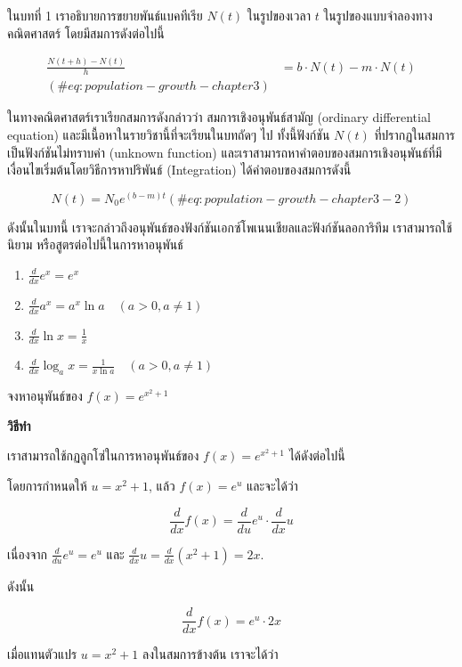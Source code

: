 \documentclass[
]{book}
\providecommand{\tightlist}{%
  \setlength{\itemsep}{0pt}\setlength{\parskip}{0pt}}
\begin{document}
ในบทที่ 1 เราอธิบายการขยายพันธ์แบคทีเรีย \(N(t)\) ในรูปของเวลา \(t\)
ในรูปของแบบจำลองทางคณิตศาสตร์ โดยมีสมการดังต่อไปนี้

\begin{align}
\frac{N(t + h) - N(t)}{h} &= b\cdot N(t)  - m\cdot N(t)\\
(\#eq:population-growth-chapter3)
\end{align}

ในทางคณิตศาสตร์เราเรียกสมการดังกล่าวว่า สมการเชิงอนุพันธ์สามัญ (ordinary
differential equation) และมีเนื้อหาในรายวิชานี้ที่จะเรียนในบทถัดๆ ไป ทั้งนี้ฟังก์ชัน
\(N(t)\) ที่ปรากฏในสมการเป็นฟังก์ชันไม่ทราบค่า (unknown function)
และเราสามารถหาคำตอบของสมการเชิงอนุพันธ์ที่มีเงื่อนไขเริ่มต้นโดยวิธีการหาปริพันธ์
(Integration) ได้คำตอบของสมการดังนี้

\begin{equation}
N(t) = N_0 e^{(b-m)t}
(\#eq:population-growth-chapter3-2)
\end{equation}

ดังนั้นในบทนี้ เราจะกล่าวถึงอนุพันธ์ของฟังก์ชันเอกซ์โพเนนเชียลและฟังก์ชันลอการิทึม
เราสามารถใช้นิยาม หรือสูตรต่อไปนี้ในการหาอนุพันธ์

\begin{enumerate}
\def\labelenumi{\arabic{enumi}.}
\tightlist
\item
  \(\displaystyle\frac{d}{dx}e^x = e^x\)
\item
  \(\displaystyle\frac{d}{dx}a^x = a^x \ln a \quad (a > 0, a \neq 1)\)
\item
  \(\displaystyle\frac{d}{dx}\ln x = \frac{1}{x}\)
\item
  \(\displaystyle\frac{d}{dx}\log_a x = \frac{1}{x \ln a} \quad (a > 0, a \neq 1)\)
\end{enumerate}

จงหาอนุพันธ์ของ \(f(x) = e^{x^2 + 1}\)

\textbf{วิธีทำ}

เราสามารถใช้กฏลูกโซ่ในการหาอนุพันธ์ของ \(f(x) = e^{x^2 + 1}\) ได้ดังต่อไปนี้

โดยการกำหนดให้ \(u = x^2 + 1\), แล้ว \(f(x) = e^u\) และจะได้ว่า

\[ \frac{d}{dx} f(x) = \frac{d}{du} e^u \cdot \frac{d}{dx} u \]

เนื่องจาก \(\frac{d}{du} e^u = e^u\) และ
\(\frac{d}{dx} u = \frac{d}{dx} (x^2 + 1) = 2x\).

ดังนั้น

\[ \frac{d}{dx} f(x) = e^u \cdot 2x \]

เมื่อแทนตัวแปร \(u = x^2 + 1\) ลงในสมการข้างต้น เราจะได้ว่า
\end{document}
